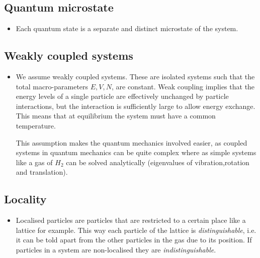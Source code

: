 \documentclass[11pt]{article}
\numberwithin{equation}{section}
\begin{document}
\subsection{Quantum microstate }
\begin{itemize}
    \item Each quantum state is a separate and distinct microstate of the system.  
\end{itemize}

\subsection{Weakly coupled systems }
\begin{itemize}
    \item We assume weakly coupled systems. These are isolated systems such that the total macro-parameters $E,V,N$, are constant. Weak coupling implies that the energy levels of a single particle are effectively unchanged by particle interactions, but the interaction is sufficiently large to allow energy exchange. This means that at equilibrium the system must have a common temperature. 

This assumption makes the quantum mechanics involved easier, as coupled systems in quantum mechanics can be quite complex where as simple systems like a gas of $H_2$ can be solved analytically (eigenvalues of vibration,rotation and translation). 
\end{itemize}

\subsection{Locality} 
\begin{itemize}
    \item Localised particles are particles that are restricted to a certain place like a lattice for example. This way each particle of the lattice is \textit{distinguishable}, i.e. it can be told apart from the other particles in the gas due to its position. If particles in a system are non-localised they are \emph{indistinguishable}. 
\end{itemize}
\end{document}

